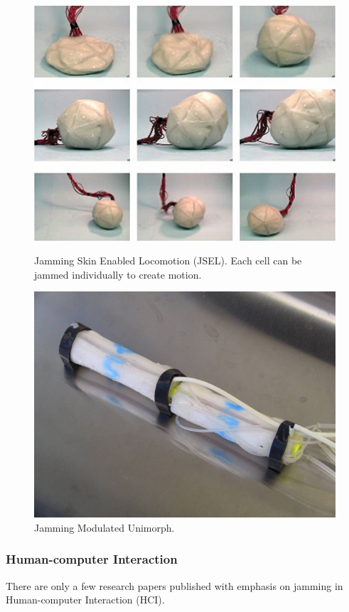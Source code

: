 \begin{figure}
\centering
\begin{minipage}[t]{.5\textwidth}
  \centering
  \includegraphics[width=.8\linewidth]{figures/jamming/chembot-robot-blob}
  \caption[Jamming Skin Enabled Locomotion (JSEL) by \citet{steltz2009jsel}.]
  {Jamming Skin Enabled Locomotion (JSEL). Each cell can be jammed individually to create motion.}
  \label{fig:ch:jamming:jsel}
\end{minipage}%
\begin{minipage}[t]{.5\textwidth}
  \centering
  \includegraphics[width=.8\linewidth]{figures/jamming/jmu-worm}
  \caption[Jamming Modulated Unimorph by \citet{steltz2010jamming}.]
  {Jamming Modulated Unimorph.}
  \label{fig:ch:jamming:jmu}
\end{minipage}
\end{figure}

\subsubsection{Human-computer Interaction}
\label{ch:jamming:related-work:hci}
There are only a few research papers published with emphasis on jamming in Human-computer Interaction (HCI). \todo{\dots}

